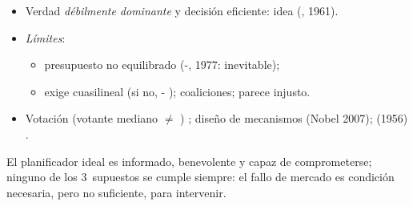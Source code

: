 \documentclass{article}
\begin{document}
\begin{columnas}
\begin{itemize}
  \begin{itemize}
  \item Sin el 3~suman $-10$: pivotal, paga 10~y gana 60.
  \end{itemize}
\item Verdad \emph{débilmente dominante} y decisión eficiente: idea  (, 1961).
\item \emph{Límites}:
  \begin{itemize}
  \item presupuesto no equilibrado (-, 1977: inevitable);
  \item exige cuasilineal (si no, - ); coaliciones; parece injusto.
  \end{itemize}
\end{itemize}
\begin{itemize}
\item Votación (votante mediano $\neq$ ) ; diseño de mecanismos (Nobel 2007);  (1956) .
\end{itemize}

\begin{ideaclave}
El planificador ideal es informado, benevolente y capaz de comprometerse; ninguno de los 3~supuestos se cumple siempre: el fallo de mercado es condición necesaria, pero no suficiente, para intervenir.
\end{ideaclave}


\end{columnas}
\end{document}
